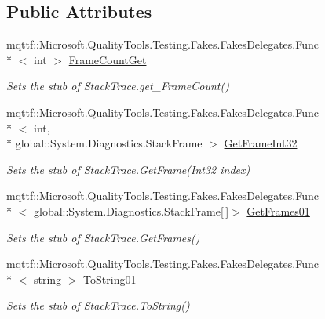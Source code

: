 \subsection*{Public Attributes}
\begin{DoxyCompactItemize}
\item 
mqttf\-::\-Microsoft.\-Quality\-Tools.\-Testing.\-Fakes.\-Fakes\-Delegates.\-Func\\*
$<$ int $>$ \hyperlink{class_system_1_1_diagnostics_1_1_fakes_1_1_stub_stack_trace_a2f65617c675a3ebb1670cd4bb0625348}{Frame\-Count\-Get}
\begin{DoxyCompactList}\small\item\em Sets the stub of Stack\-Trace.\-get\-\_\-\-Frame\-Count()\end{DoxyCompactList}\item 
mqttf\-::\-Microsoft.\-Quality\-Tools.\-Testing.\-Fakes.\-Fakes\-Delegates.\-Func\\*
$<$ int, \\*
global\-::\-System.\-Diagnostics.\-Stack\-Frame $>$ \hyperlink{class_system_1_1_diagnostics_1_1_fakes_1_1_stub_stack_trace_ae1e2d4b82659a120812e371b1667ba4f}{Get\-Frame\-Int32}
\begin{DoxyCompactList}\small\item\em Sets the stub of Stack\-Trace.\-Get\-Frame(\-Int32 index)\end{DoxyCompactList}\item 
mqttf\-::\-Microsoft.\-Quality\-Tools.\-Testing.\-Fakes.\-Fakes\-Delegates.\-Func\\*
$<$ global\-::\-System.\-Diagnostics.\-Stack\-Frame\mbox{[}$\,$\mbox{]}$>$ \hyperlink{class_system_1_1_diagnostics_1_1_fakes_1_1_stub_stack_trace_acfdf53d03647da1389e6c50ffa6632ec}{Get\-Frames01}
\begin{DoxyCompactList}\small\item\em Sets the stub of Stack\-Trace.\-Get\-Frames()\end{DoxyCompactList}\item 
mqttf\-::\-Microsoft.\-Quality\-Tools.\-Testing.\-Fakes.\-Fakes\-Delegates.\-Func\\*
$<$ string $>$ \hyperlink{class_system_1_1_diagnostics_1_1_fakes_1_1_stub_stack_trace_aa6aefdaffdad64ab364011be5f9f88a7}{To\-String01}
\begin{DoxyCompactList}\small\item\em Sets the stub of Stack\-Trace.\-To\-String()\end{DoxyCompactList}\end{DoxyCompactItemize}
